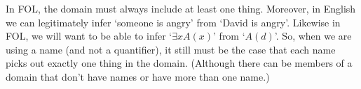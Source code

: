 In FOL, the domain must always include at least one thing. Moreover, in English we can legitimately infer ‘someone is angry’ from ‘David is angry’. Likewise in FOL, we will want to be able to infer ‘$\exists xA(x)$’ from ‘$A(d)$’. So, when we are using a name (and not a quantifier), it still must be the case that each name picks out exactly one thing in the domain. (Although there can be members of a domain that don’t have names or have more than one name.)




